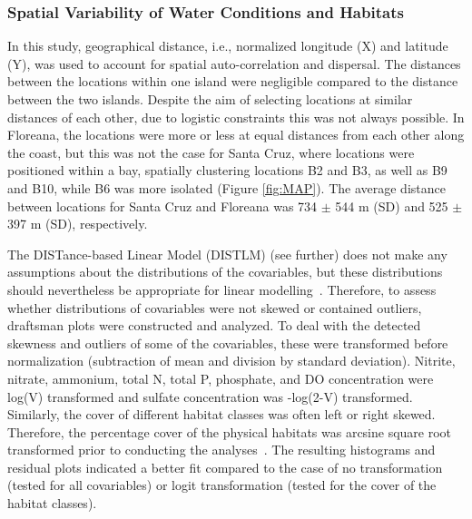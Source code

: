 \documentclass[jmse,article,accept,moreauthors,pdftex]{Definitions/mdpi}
\begin{document}
\subsubsection{Spatial Variability of Water Conditions and Habitats}
\label{Methods:env_grouping}

In this study, geographical distance, i.e., normalized longitude (X) and latitude (Y), was used to account for spatial auto-correlation and dispersal. The distances between the locations within one island were negligible compared to the distance between the two islands. Despite the aim of selecting locations at similar distances of each other, due to logistic constraints this was not always possible. In Floreana, the locations were more or less at equal distances from each other along the coast, but this was not the case for Santa Cruz, where locations were positioned within a bay, spatially clustering locations B2 and B3, as well as B9 and B10, while B6 was more isolated (Figure \ref{fig:MAP}). The average distance between locations for Santa Cruz and Floreana was 734 $\pm$ 544 m (SD) and 525 $\pm$ 397 m (SD), respectively. 

The DISTance-based Linear Model (DISTLM) (see further) does not make any assumptions about the distributions of the covariables, but these distributions should nevertheless be appropriate for linear \mbox{modelling \citep{Anderson2008PERMANOVA+Methods,Legendre1999Distance-basedExperiments}.} Therefore, to assess whether distributions of covariables were not skewed or contained outliers, draftsman plots were constructed and analyzed. To deal with the detected skewness and outliers of some of the covariables, these were transformed before normalization (subtraction of mean and division by standard deviation). Nitrite, nitrate, ammonium, total N, total P, phosphate, and DO concentration were log(V) transformed and sulfate concentration was -log(2-V) transformed. Similarly, the cover of different habitat classes was often left or right skewed. Therefore, the percentage cover of the physical habitats was arcsine square root transformed prior to conducting the \mbox{analyses \citep{Gotelli2004AStatistics.}.} The resulting histograms and residual plots indicated a better fit compared to the case of no transformation (tested for all covariables) or logit transformation (tested for the cover of the habitat classes).
\end{document}

